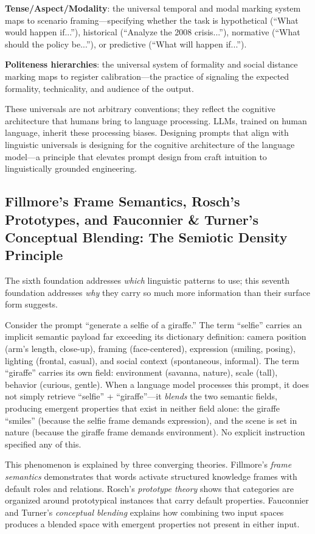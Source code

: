 \documentclass[12pt,a4paper]{article}
\begin{document}
\textbf{Tense/Aspect/Modality}: the universal temporal and modal marking system maps to scenario framing---specifying whether the task is hypothetical (``What would happen if...''), historical (``Analyze the 2008 crisis...''), normative (``What should the policy be...''), or predictive (``What will happen if...'').

\textbf{Politeness hierarchies}: the universal system of formality and social distance marking maps to register calibration---the practice of signaling the expected formality, technicality, and audience of the output.

These universals are not arbitrary conventions; they reflect the cognitive architecture that humans bring to language processing. LLMs, trained on human language, inherit these processing biases. Designing prompts that align with linguistic universals is designing for the cognitive architecture of the language model---a principle that elevates prompt design from craft intuition to linguistically grounded engineering.

\subsection{Fillmore's Frame Semantics, Rosch's Prototypes, and Fauconnier \& Turner's Conceptual Blending: The Semiotic Density Principle}
\label{sec:theory:density}

The sixth foundation addresses \emph{which} linguistic patterns to use; this seventh foundation addresses \emph{why} they carry so much more information than their surface form suggests.

Consider the prompt ``generate a selfie of a giraffe.'' The term ``selfie'' carries an implicit semantic payload far exceeding its dictionary definition: camera position (arm's length, close-up), framing (face-centered), expression (smiling, posing), lighting (frontal, casual), and social context (spontaneous, informal). The term ``giraffe'' carries its own field: environment (savanna, nature), scale (tall), behavior (curious, gentle). When a language model processes this prompt, it does not simply retrieve ``selfie'' + ``giraffe''---it \emph{blends} the two semantic fields, producing emergent properties that exist in neither field alone: the giraffe ``smiles'' (because the selfie frame demands expression), and the scene is set in nature (because the giraffe frame demands environment). No explicit instruction specified any of this.

This phenomenon is explained by three converging theories. Fillmore's \emph{frame semantics} \citep{fillmore1982frame} demonstrates that words activate structured knowledge frames with default roles and relations. Rosch's \emph{prototype theory} \citep{rosch1975cognitive} shows that categories are organized around prototypical instances that carry default properties. Fauconnier and Turner's \emph{conceptual blending} \citep{fauconnier2002way} explains how combining two input spaces produces a blended space with emergent properties not present in either input.
\end{document}
